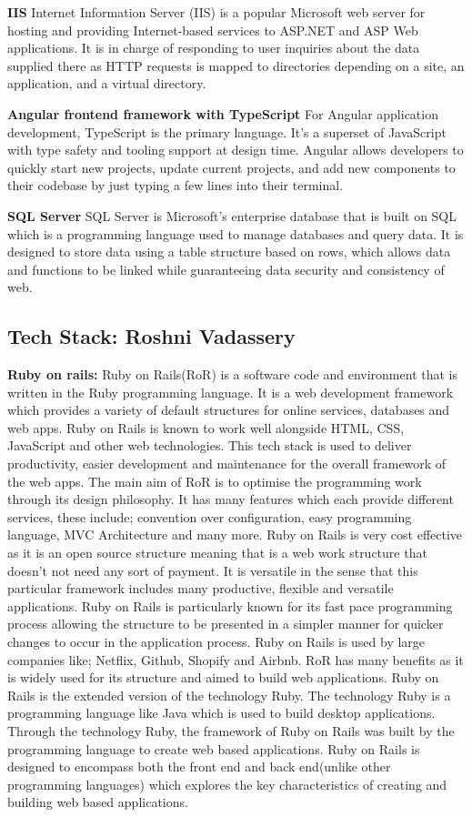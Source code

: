 \documentclass[a4paper, 11pt]{report}
\begin{document}
\textbf{IIS}
  Internet Information Server (IIS) is a popular Microsoft web server for hosting and providing Internet-based services to ASP.NET and ASP Web applications\cite{ctan}. It is in charge of responding to user inquiries about the data supplied there as HTTP requests is mapped to directories depending on a site, an application, and a virtual directory.

\textbf{Angular frontend framework with TypeScript}
  For Angular application development, TypeScript is the primary language. It's a superset of JavaScript with type safety and tooling support at design time. Angular allows developers to quickly start new projects, update current projects, and add new components to their codebase by just typing a few lines into their terminal. \cite{angular}
  
\textbf{SQL Server}
  SQL Server is Microsoft's enterprise database that is built on SQL which is a programming language used to manage databases and query data.  It is designed to store data using a table structure based on rows, which allows data and functions to be linked while guaranteeing data security and consistency of web.


\subsection{Tech Stack: Roshni Vadassery}

\textbf{Ruby on rails:} Ruby on Rails(RoR) is a software code and environment that is written in the Ruby programming language. It is a web development framework which provides a variety of default structures for online services, databases and web apps. Ruby on Rails is known to work well alongside HTML, CSS, JavaScript and other web technologies. This tech stack is used to deliver productivity, easier development and maintenance for the overall framework of the web apps. The main aim of RoR is to optimise the programming work through its design philosophy. It has many features which each provide different services, these include; convention over configuration, easy programming language, MVC Architecture and many more.  Ruby on Rails is very cost effective as it is an open source structure meaning that is a web work structure that doesn't not need any sort of payment. It is versatile in the sense that this particular framework includes many productive, flexible and versatile applications. Ruby on Rails is particularly known for its fast pace programming process allowing the structure to be presented in a simpler manner for quicker changes to occur in the application process. Ruby on Rails is used by large companies like; Netflix, Github, Shopify and Airbnb. RoR has many benefits as it is widely used for its structure and aimed to build web applications. Ruby on Rails is the extended version of the technology Ruby. The technology Ruby is a programming language like Java which is used to build desktop applications. Through the technology Ruby, the framework of Ruby on Rails was built by the programming language to create web based applications. Ruby on Rails is designed to encompass both the front end and back end(unlike other programming languages) which explores the key characteristics of creating and building web based applications. 
\end{document}
